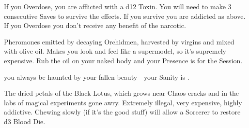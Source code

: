 {\begin{multicols}{2}

  If you Overdose, you are afflicted with a d12 Toxin\footnotemark[\value{footnote}].  You will need to make 3 consecutive Saves to survive the effects.  If you survive you are addicted as above. If you Overdose you don't receive any benefit of the narcotic.

  \cbreak






  Pheromones emitted by decaying Orchidmen, harvested by virgins and mixed with olive oil.  Makes you look and feel like a supermodel, so it's supremely expensive.  Rub the oil on your naked body and your \MAX Presence is \DCUP for the Session.

    you always be haunted by your fallen beauty - your \MAX Sanity is \DCDOWN.


  The dried petals of the Black Lotus, which grows near Chaos cracks and in the labs of magical experiments gone awry. Extremely illegal, very expensive, highly addictive.  Chewing slowly (if it's the good stuff) will allow a Sorcerer to restore d3 Blood Die.


\end{multicols}}
